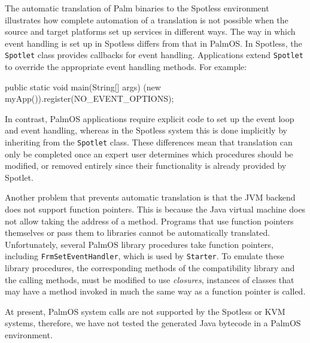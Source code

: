 The automatic translation of Palm binaries to the Spotless environment 
illustrates how complete automation of a translation is not 
possible when the source and target platforms set up services
in different ways.  
The way in which event handling is set up in Spotless
differs from that in PalmOS.  
In Spotless, the \texttt{Spotlet} class
provides callbacks for event handling.
Applications extend \texttt{Spotlet}
to override the appropriate event handling methods.
For example:

\begin{fnverbatim}
public static void main(String[] args) {
    (new myApp()).register(NO_EVENT_OPTIONS);
}
\end{fnverbatim} 

In contrast, PalmOS applications require explicit code to
set up the event loop and event handling,
whereas in the Spotless system this is done implicitly
by inheriting from the \texttt{Spotlet} class.  
These differences mean that translation can only be
completed once an expert user determines
which procedures should be modified, or removed entirely
since their functionality is already provided by Spotlet.

Another problem that prevents automatic translation
is that the JVM backend does not support function pointers.
This is because the Java virtual machine
does not allow taking the address of a method.
Programs that use function pointers themselves or pass them to libraries
cannot be automatically translated.
Unfortunately, several PalmOS library procedures take function pointers,
including \texttt{FrmSetEventHandler}, which is used by \texttt{Starter}.
To emulate these library procedures, 
the corresponding methods of the compatibility library
and the calling methods,
must be modified to use \emph{closures},
instances of classes that may have a method invoked
in much the same way as a function pointer is called.

At present, PalmOS system calls are not supported by the 
Spotless or KVM systems, therefore, we have not tested 
the generated Java bytecode in a PalmOS environment. 


